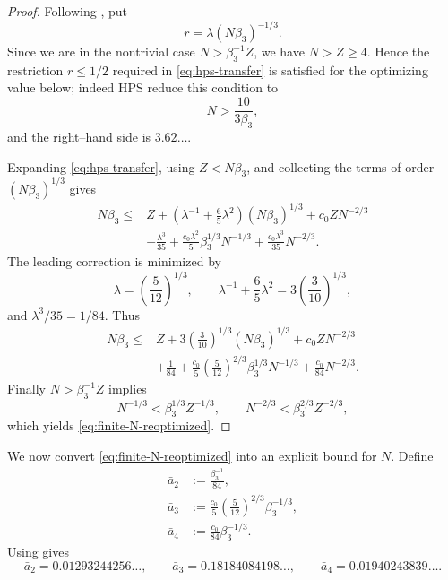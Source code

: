 \begin{proof}
Following \cite[Section 7.3]{HPS2025}, put
\[
 r=\lambda(N\beta_3)^{-1/3}.
\]
Since we are in the nontrivial case $N>\beta_3^{-1}Z$, we have $N>Z\ge4$.  Hence the restriction $r\le1/2$ required in \eqref{eq:hps-transfer} is satisfied for the optimizing value below; indeed HPS reduce this condition to
\[
 N>\frac{10}{3\beta_3},
\]
and the right--hand side is $3.62\ldots$.

Expanding \eqref{eq:hps-transfer}, using $Z<N\beta_3$, and collecting the terms of order $(N\beta_3)^{1/3}$ gives
\begin{align*}
N\beta_3\le{}&
 Z+\left(\lambda^{-1}+\frac65\lambda^2\right)(N\beta_3)^{1/3}
 +c_0ZN^{-2/3} \\
&+\frac{\lambda^3}{35}
 +\frac{c_0\lambda^2}{5}\beta_3^{1/3}N^{-1/3}
 +\frac{c_0\lambda^3}{35}N^{-2/3}.
\end{align*}
The leading correction is minimized by
\[
 \lambda=\left(\frac5{12}\right)^{1/3},
 \qquad
 \lambda^{-1}+\frac65\lambda^2
 =3\left(\frac3{10}\right)^{1/3},
\]
and $\lambda^3/35=1/84$.  Thus
\begin{align*}
N\beta_3\le{}&
 Z+3\left(\frac3{10}\right)^{1/3}(N\beta_3)^{1/3}
 +c_0ZN^{-2/3} \\
&+\frac1{84}
 +\frac{c_0}{5}\left(\frac5{12}\right)^{2/3}
   \beta_3^{1/3}N^{-1/3}
 +\frac{c_0}{84}N^{-2/3}.
\end{align*}
Finally $N>\beta_3^{-1}Z$ implies
\[
 N^{-1/3}<\beta_3^{1/3}Z^{-1/3},
 \qquad
 N^{-2/3}<\beta_3^{2/3}Z^{-2/3},
\]
which yields \eqref{eq:finite-N-reoptimized}.
\end{proof}

We now convert \eqref{eq:finite-N-reoptimized} into an explicit bound for $N$.  Define
\begin{align*}
 \bar a_2&:=\frac{\beta_3^{-1}}{84},\\
 \bar a_3&:=
 \frac{c_0}{5}\left(\frac5{12}\right)^{2/3}\beta_3^{-1/3},\\
 \bar a_4&:=\frac{c_0}{84}\beta_3^{-1/3}.
\end{align*}
Using  gives
\[
 \bar a_2=0.01293244256\ldots,\qquad
 \bar a_3=0.18184084198\ldots,\qquad
 \bar a_4=0.01940243839\ldots.
\]

